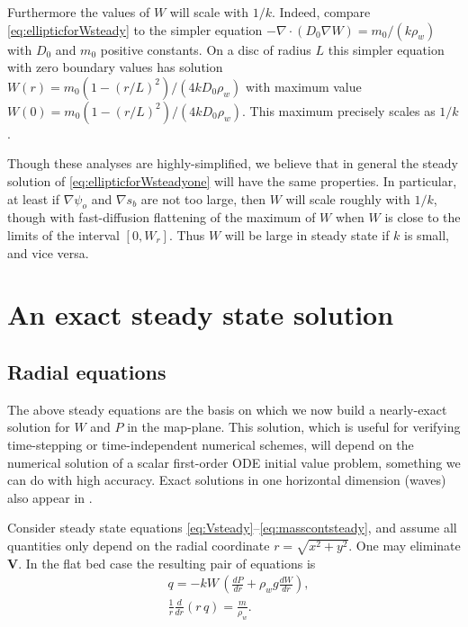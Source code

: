 \documentclass[gmd]{copernicus}   %
\newcommand\bV{\mathbf{V}}
\newcommand{\Div}{\nabla\cdot}
\newcommand{\grad}{\nabla}
\begin{document}
Furthermore the values of $W$ will scale with $1/k$.  Indeed, compare \eqref{eq:ellipticforWsteady} to the simpler equation $-\Div \left(D_0 \grad W\right) = m_0/(k \rho_w)$ with $D_0$ and $m_0$ positive constants.  On a disc of radius $L$ this simpler equation with zero boundary values has solution $W(r) = m_0 (1-(r/L)^2) / (4 k D_0 \rho_w)$ with maximum value $W(0)=m_0 (1-(r/L)^2) / (4 k D_0 \rho_w)$.  This maximum precisely scales as $1/k$.

Though these analyses are highly-simplified, we believe that in general the steady solution of \eqref{eq:ellipticforWsteadyone} will have the same properties.  In particular, at least if $\grad \psi_o$ and $\grad s_b$ are not too large, then $W$ will scale roughly with $1/k$, though with fast-diffusion flattening of the maximum of $W$ when $W$ is close to the limits of the interval $[0,W_r]$.  Thus $W$ will be large in steady state if $k$ is small, and vice versa.


\section{An exact steady state solution}  \label{sec:exactsolution}

\subsection{Radial equations}  The above steady equations are the basis on which we now build a nearly-exact solution for $W$ and $P$ in the map-plane.  This solution, which is useful for verifying time-stepping or time-independent numerical schemes, will depend on the numerical solution of a scalar first-order ODE initial value problem, something we can do with high accuracy.  Exact solutions in one horizontal dimension (waves) also appear in \cite{Schoofetal2012}.

Consider steady state equations \eqref{eq:Vsteady}--\eqref{eq:masscontsteady}, and assume all quantities only depend on the radial coordinate $r = \sqrt{x^2+y^2}$.  One may eliminate $\bV$.  In the flat bed case the resulting pair of equations is
\begin{align}
&q = - k W\, \left(\frac{dP}{dr} + \rho_w g \frac{dW}{dr}\right), \label{eq:rsflux} \\
&\frac{1}{r}\frac{d}{dr}\left(r\,q\right) = \frac{m}{\rho_w}. \label{eq:rsconserve}
\end{align}
\end{document}
